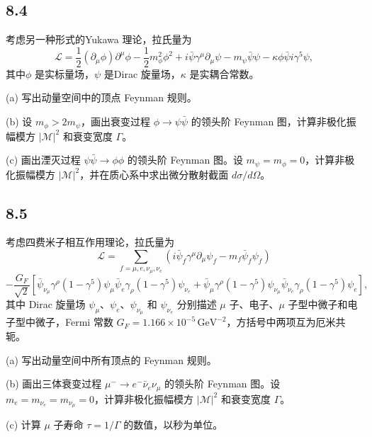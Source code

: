 \newpage
\subsection{8.4}
考虑另一种形式的Yukawa 理论，拉氏量为
$$
\mathcal{L} = \frac{1}{2}(\partial_\mu\phi)\partial^\mu\phi - \frac{1}{2} m_\phi^2 \phi^2 + i \bar{\psi}\gamma^\mu\partial_\mu\psi - m_\psi \bar{\psi}\psi - \kappa \phi \bar{\psi} i\gamma^5 \psi,
$$
其中$\phi$ 是实标量场，$\psi$ 是Dirac 旋量场，$\kappa$ 是实耦合常数。

(a) 写出动量空间中的顶点 Feynman 规则。

(b) 设 $m_\phi > 2m_\psi$，画出衰变过程 $\phi \to \psi\bar{\psi}$ 的领头阶 Feynman 图，计算非极化振幅模方 $|\mathcal{M}|^2$ 和衰变宽度 $\Gamma$。

(c) 画出湮灭过程 $\psi\bar{\psi} \to \phi\phi$ 的领头阶 Feynman 图。设 $m_\psi = m_\phi = 0$，计算非极化振幅模方 $|\mathcal{M}|^2$，并在质心系中求出微分散射截面 $d\sigma/d\Omega$。

\newpage
\subsection{8.5}
考虑四费米子相互作用理论，拉氏量为
$$
\mathcal{L} = \sum_{f=\mu, e,\nu_{\mu}, \nu_e} (i\bar{\psi}_f \gamma^\mu \partial_\mu \psi_f - m_f \bar{\psi}_f \psi_f)
$$
$$
- \frac{G_F}{\sqrt{2}} [\bar{\psi}_{\nu_{\mu}} \gamma^\rho (1-\gamma^5) \psi_{\mu} \bar{\psi}_e \gamma_\rho (1-\gamma^5) \psi_{\nu_e} + \bar{\psi}_{\mu} \gamma^\rho (1-\gamma^5) \psi_{\nu_{\mu}} \bar{\psi}_{\nu_e} \gamma_\rho (1-\gamma^5) \psi_e],
$$
其中 Dirac 旋量场 $\psi_{\mu}$、$\psi_e$、$\psi_{\nu_{\mu}}$ 和 $\psi_{\nu_e}$ 分别描述 $\mu$ 子、电子、$\mu$ 子型中微子和电子型中微子，Fermi 常数 $G_F = 1.166 \times 10^{-5} \, \text{GeV}^{-2}$，方括号中两项互为厄米共轭。

(a) 写出动量空间中所有顶点的 Feynman 规则。

(b) 画出三体衰变过程 $\mu^- \to e^- \bar{\nu}_e \nu_{\mu}$ 的领头阶 Feynman 图。设 $m_e = m_{\nu_e} = m_{\nu_{\mu}} = 0$，计算非极化振幅模方 $|\mathcal{M}|^2$ 和衰变宽度 $\Gamma$。

(c) 计算 $\mu$ 子寿命 $\tau = 1/\Gamma$ 的数值，以秒为单位。

\newpage
